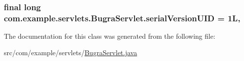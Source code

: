 \subsubsection[{serial\+Version\+U\+I\+D}]{\setlength{\rightskip}{0pt plus 5cm}final long com.\+example.\+servlets.\+Bugra\+Servlet.\+serial\+Version\+U\+I\+D = 1\+L\hspace{0.3cm}{\ttfamily [static]}, {\ttfamily [private]}}\label{classcom_1_1example_1_1servlets_1_1_bugra_servlet_a017b832dab85959c1a172b508ce28716}


The documentation for this class was generated from the following file\+:\begin{DoxyCompactItemize}
\item 
src/com/example/servlets/\hyperlink{_bugra_servlet_8java}{Bugra\+Servlet.\+java}\end{DoxyCompactItemize}
